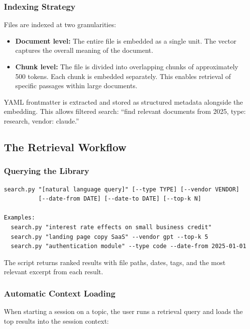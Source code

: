 \documentclass[12pt,letterpaper]{article}
\begin{document}
\subsubsection{Indexing Strategy}

Files are indexed at two granularities:

\begin{itemize}
  \item \textbf{Document level:} The entire file is embedded as a single
        unit. The vector captures the overall meaning of the document.
  \item \textbf{Chunk level:} The file is divided into overlapping chunks
        of approximately 500 tokens. Each chunk is embedded separately.
        This enables retrieval of specific passages within large documents.
\end{itemize}

YAML frontmatter is extracted and stored as structured metadata alongside
the embedding. This allows filtered search: ``find relevant documents
from 2025, type: research, vendor: claude.''

\subsection{The Retrieval Workflow}

\subsubsection{Querying the Library}

\begin{lstlisting}
search.py "[natural language query]" [--type TYPE] [--vendor VENDOR]
          [--date-from DATE] [--date-to DATE] [--top-k N]

Examples:
  search.py "interest rate effects on small business credit"
  search.py "landing page copy SaaS" --vendor gpt --top-k 5
  search.py "authentication module" --type code --date-from 2025-01-01
\end{lstlisting}

The script returns ranked results with file paths, dates, tags, and
the most relevant excerpt from each result.

\subsubsection{Automatic Context Loading}

When starting a session on a topic, the user runs a retrieval query
and loads the top results into the session context:
\end{document}
